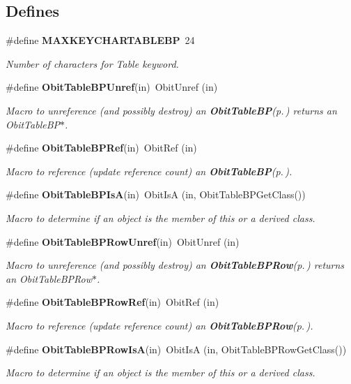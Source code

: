 \subsection*{Defines}
\begin{CompactItemize}
\item 
\#define {\bf MAXKEYCHARTABLEBP}\ 24
\begin{CompactList}\small\item\em Number of characters for Table keyword. \item\end{CompactList}\item 
\#define {\bf Obit\-Table\-BPUnref}(in)\ Obit\-Unref (in)
\begin{CompactList}\small\item\em Macro to unreference (and possibly destroy) an {\bf Obit\-Table\-BP}{\rm (p.\,\pageref{structObitTableBP})} returns an Obit\-Table\-BP$\ast$. \item\end{CompactList}\item 
\#define {\bf Obit\-Table\-BPRef}(in)\ Obit\-Ref (in)
\begin{CompactList}\small\item\em Macro to reference (update reference count) an {\bf Obit\-Table\-BP}{\rm (p.\,\pageref{structObitTableBP})}. \item\end{CompactList}\item 
\#define {\bf Obit\-Table\-BPIs\-A}(in)\ Obit\-Is\-A (in, Obit\-Table\-BPGet\-Class())
\begin{CompactList}\small\item\em Macro to determine if an object is the member of this or a derived class. \item\end{CompactList}\item 
\#define {\bf Obit\-Table\-BPRow\-Unref}(in)\ Obit\-Unref (in)
\begin{CompactList}\small\item\em Macro to unreference (and possibly destroy) an {\bf Obit\-Table\-BPRow}{\rm (p.\,\pageref{structObitTableBPRow})} returns an Obit\-Table\-BPRow$\ast$. \item\end{CompactList}\item 
\#define {\bf Obit\-Table\-BPRow\-Ref}(in)\ Obit\-Ref (in)
\begin{CompactList}\small\item\em Macro to reference (update reference count) an {\bf Obit\-Table\-BPRow}{\rm (p.\,\pageref{structObitTableBPRow})}. \item\end{CompactList}\item 
\#define {\bf Obit\-Table\-BPRow\-Is\-A}(in)\ Obit\-Is\-A (in, Obit\-Table\-BPRow\-Get\-Class())
\begin{CompactList}\small\item\em Macro to determine if an object is the member of this or a derived class. \item\end{CompactList}\end{CompactItemize}
